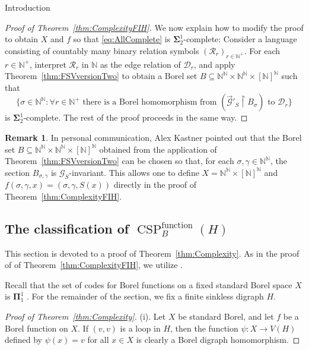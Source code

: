 \documentclass[psamsfonts]{amsart}
\theoremstyle{definition}
\newtheorem{remark}[thm]{Remark}
\newcommand{\N}{\mathbb N}
\theoremstyle{remark}
\numberwithin{equation}{section}
\newcommand{\rest}{\restriction}
\newcommand\mbf{\mathbf}
\newcommand\mcal{\mathcal}
\begin{document}
\begin{section}{Introduction}
\begin{proof}[Proof of Theorem~\ref{thm:ComplexityFIH}]
We now explain how to modify the proof to obtain $X$ and $f$ so that \eqref{eq:AllComplete} is $\mbf{\Sigma}^1_2$-complete: Consider a language consisting of countably many binary relation symbols $(\mcal{R}_r)_{r \in \N^+}$. For each $r \in \N^+$, interpret $\mcal{R}_r$ in $\N$ as the edge relation of $\mcal{D}_r$, and apply Theorem~\ref{thm:FSVversionTwo} to obtain a Borel set $B \subseteq \N^{\N} \times \N^{\N} \times [\N]^{\N}$ such that
\begin{equation}
        \{\sigma\in \N^\N: \forall r\in \N^+ \text{ there is a Borel homomorphism from } (\overrightarrow{\mcal{G}}'_S \rest B_{\sigma}) \text{ to } \mcal{D}_r \}
    \end{equation}
is $\mbf{\Sigma}^1_2$-complete. The rest of the proof proceeds in the same way.
\end{proof}

\begin{remark}
\label{rem:Alex}
    In personal communication, Alex Kastner pointed out that the Borel set $B \subseteq \N^{\N} \times \N^{\N} \times [\N]^{\N}$ obtained from the application of Theorem~\ref{thm:FSVversionTwo} can be chosen so that, for each $\sigma, \gamma \in \N^{\N}$, the section $B_{\sigma, \gamma}$ is $\mcal{G}_S$-invariant. This allows one to define $X = \N^{\N} \times [\N]^{\N}$ and $f(\sigma, \gamma, x) = (\sigma, \gamma, S(x))$ directly in the proof of Theorem~\ref{thm:ComplexityFIH}.
\end{remark}



\section{The classification of $\operatorname{CSP}^{\operatorname{function}}_B(H)$}
\label{sec:DigraphHom}

This section is devoted to a proof of Theorem~\ref{thm:Complexity}.
As in the proof of of Theorem~\ref{thm:ComplexityFIH}, we utilize \cite[Theorem~3.1]{fsv2024}.


Recall that the set of codes for Borel functions on a fixed standard Borel space $X$ is $\mbf{\Pi}^1_1$ \cite[Lemma~A.3]{hkm2024}.
For the remainder of the section, we fix a finite sinkless digraph $H$.

\begin{proof}[Proof of Theorem~\ref{thm:Complexity}]
(i). Let $X$ be standard Borel, and let $f$ be a Borel function on $X$. If $(v,v)$ is a loop in $H$, then the function $\psi : X \to V(H)$ defined by $\psi(x) = v$ for all $x \in X$ is clearly a Borel digraph homomorphism.


\end{proof}
\end{section}
\end{document}
